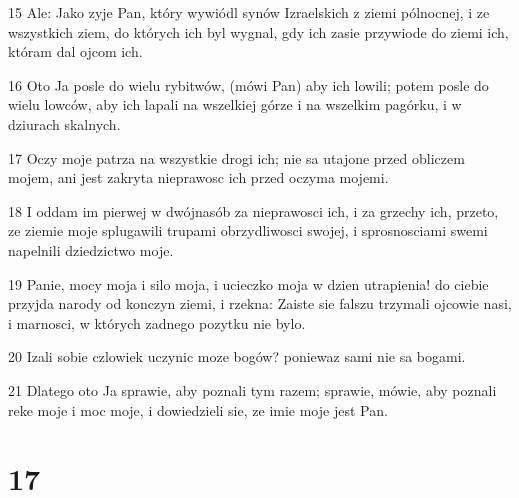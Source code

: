 \par 15 Ale: Jako zyje Pan, który wywiódl synów Izraelskich z ziemi pólnocnej, i ze wszystkich ziem, do których ich byl wygnal, gdy ich zasie przywiode do ziemi ich, któram dal ojcom ich.
\par 16 Oto Ja posle do wielu rybitwów, (mówi Pan) aby ich lowili; potem posle do wielu lowców, aby ich lapali na wszelkiej górze i na wszelkim pagórku, i w dziurach skalnych.
\par 17 Oczy moje patrza na wszystkie drogi ich; nie sa utajone przed obliczem mojem, ani jest zakryta nieprawosc ich przed oczyma mojemi.
\par 18 I oddam im pierwej w dwójnasób za nieprawosci ich, i za grzechy ich, przeto, ze ziemie moje splugawili trupami obrzydliwosci swojej, i sprosnosciami swemi napelnili dziedzictwo moje.
\par 19 Panie, mocy moja i silo moja, i ucieczko moja w dzien utrapienia! do ciebie przyjda narody od konczyn ziemi, i rzekna: Zaiste sie falszu trzymali ojcowie nasi, i marnosci, w których zadnego pozytku nie bylo.
\par 20 Izali sobie czlowiek uczynic moze bogów? poniewaz sami nie sa bogami.
\par 21 Dlatego oto Ja sprawie, aby poznali tym razem; sprawie, mówie, aby poznali reke moje i moc moje, i dowiedzieli sie, ze imie moje jest Pan.

\chapter{17}

